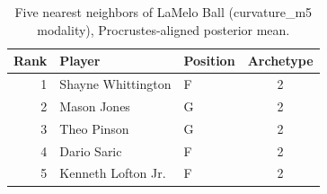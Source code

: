 \begin{table}[htbp]
  \centering\small
  \begin{tabular}{rllc}
    \toprule
    Rank & Player & Position & Archetype \\
    \midrule
    1 & Shayne Whittington & F & 2 \\
    2 & Mason Jones & G & 2 \\
    3 & Theo Pinson & G & 2 \\
    4 & Dario Saric & F & 2 \\
    5 & Kenneth Lofton Jr. & F & 2 \\
    \bottomrule
  \end{tabular}
  \caption{Five nearest neighbors of LaMelo Ball (curvature_m5 modality), Procrustes-aligned posterior mean.}
  \label{tab:LaMelo_Ball_neighbors_curvature_m5}
\end{table}

